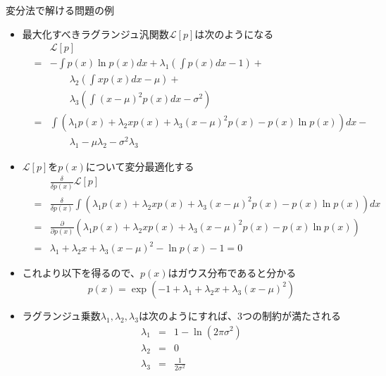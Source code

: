 \documentclass[dvipdfmx,notheorems,t]{beamer}
\begin{document}
\begin{frame}{変分法で解ける問題の例}
\begin{itemize}
\begin{itemize}
		\item 最大化すべきラグランジュ汎関数$\mathcal{L}[p]$は次のようになる
		\begin{eqnarray}
			&& \mathcal{L}[p] \nonumber \\
			&=& -\int p(x) \ln p(x) dx + \lambda_1 \left( \int p(x) dx - 1 \right) + \nonumber \\
			&& \qquad \lambda_2 \left( \int x p(x) dx - \mu \right) + \nonumber \\
			&& \qquad \lambda_3 \left( \int (x - \mu)^2 p(x) dx - \sigma^2 \right) \\
			&=& \int \left( \lambda_1 p(x) + \lambda_2 x p(x) + \lambda_3 (x - \mu)^2 p(x) - p(x) \ln p(x) \right) dx - \nonumber \\
			&& \qquad \lambda_1 - \mu \lambda_2 - \sigma^2 \lambda_3
		\end{eqnarray}
		
		\item $\mathcal{L}[p]$を$p(x)$について変分最適化する
		\begin{eqnarray}
			&& \frac{\delta}{\delta p(x)} \mathcal{L}[p] \nonumber \\
			&=& \frac{\delta}{\delta p(x)} \int \left( \lambda_1 p(x) + \lambda_2 x p(x) + \lambda_3 (x - \mu)^2 p(x) - p(x) \ln p(x) \right) dx \nonumber \\
			&=& \frac{\partial}{\partial p(x)} \left( \lambda_1 p(x) + \lambda_2 x p(x) + \lambda_3 (x - \mu)^2 p(x) - p(x) \ln p(x) \right) \nonumber \\
			&=& \lambda_1 + \lambda_2 x + \lambda_3 (x - \mu)^2 - \ln p(x) - 1 = 0
		\end{eqnarray}
		
		\item これより以下を得るので、$p(x)$は\alert{ガウス分布}であると分かる
		\begin{equation}
			p(x) = \exp \left( -1 + \lambda_1 + \lambda_2 x + \lambda_3 (x - \mu)^2 \right)
		\end{equation}
		
		\item ラグランジュ乗数$\lambda_1, \lambda_2, \lambda_3$は次のようにすれば、3つの制約が満たされる
		\begin{eqnarray}
			\lambda_1 &=& 1 - \ln \left( 2 \pi \sigma^2 \right) \\
			\lambda_2 &=& 0 \\
			\lambda_3 &=& \frac{1}{2 \sigma^2}
		\end{eqnarray}
		

\end{itemize}
\end{itemize}
\end{frame}
\end{document}
